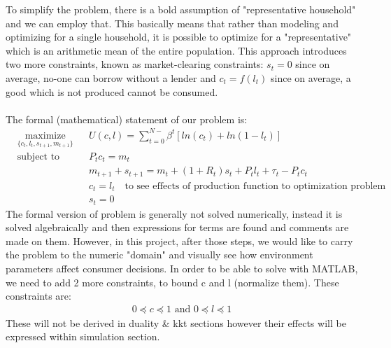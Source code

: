 To simplify the problem, there is a bold assumption of "representative household" and we can employ that. This basically means that rather than modeling and optimizing for a single household, it is possible to optimize for a "representative" which is an arithmetic mean of the entire population. This approach introduces two more constraints, known as market-clearing constraints: $ s_t = 0 $ since on average, no-one can borrow without a lender and 
$ c_t = f(l_t)  $ since on average, a good which is not produced cannot be consumed. \\
\\The formal (mathematical) statement of our problem is:
\begin{equation*}
\begin{aligned}
& \underset{ \{ c_t,l_t,s_{t+1},m_{t+1} \} }{\text{maximize}}
& & U(c,l) = \sum_{t=0}^{N-}{\beta^t}[ln(c_t)+ln(1-l_t)] \\
& \text{subject to}
& & P_tc_t=m_t\\
& & & m_{t+1}+s_{t+1}=m_t+(1+R_t)s_t+P_tl_t+\tau_t-P_tc_t \\
& & & c_t = l_t \quad \text{to see effects of production function to optimization problem} \\
& & & s_t = 0
\end{aligned}
\end{equation*}
The formal version of problem is generally not solved numerically, instead it is solved algebraically and then expressions for terms are found and comments are made on them. However, in this project, after those steps, we would like to carry the problem to the numeric "domain" and visually see how environment parameters affect consumer decisions. In order to be able to solve with MATLAB, we need to add 2 more constraints, to bound c and l (normalize them). These constraints are:
\begin{align*}
0 \preceq c \preceq 1 \textrm{ and } 0 \preceq l \preceq 1
\end{align*}
These will not be derived in duality \& kkt sections however their effects will be expressed within simulation section.
